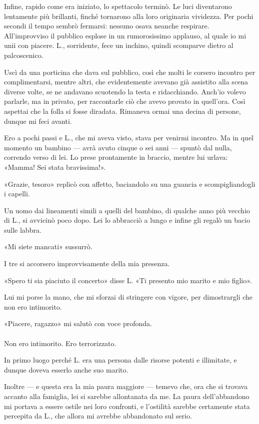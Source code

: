 \documentclass[a4paper,12pt]{book}
\begin{document}
Infine, rapido come era iniziato, lo spettacolo terminò. Le luci diventarono
lentamente più brillanti, finché tornarono alla loro originaria vividezza. Per
pochi secondi il tempo sembrò fermarsi: nessuno osava neanche respirare.
All'improvviso il pubblico esplose in un rumorosissimo applauso, al quale io mi
unii con piacere. L., sorridente, fece un inchino, quindi scomparve dietro al
palcoscenico.

Uscì da una porticina che dava sul pubblico, così che molti le corsero incontro
per complimentarsi, mentre altri, che evidentemente avevano già assistito alla
scena diverse volte, se ne andavano scuotendo la testa e ridacchiando. Anch'io
volevo parlarle, ma in privato, per raccontarle ciò che avevo provato in quell'ora.
Così aspettai che la folla si fosse diradata. Rimaneva ormai una decina di
persone, dunque mi feci avanti.

Ero a pochi passi e L., che mi aveva visto, stava per venirmi incontro. Ma in
quel momento un bambino --- avrà avuto cinque o sei anni --- spuntò dal nulla,
correndo verso di lei. Lo prese prontamente in braccio, mentre lui urlava:
«Mamma! Sei stata bravissima!».

«Grazie, tesoro» replicò con affetto, baciandolo su una guancia e scompigliandogli
i capelli.

Un uomo dai lineamenti simili a quelli del bambino, di qualche anno più vecchio
di L., si avvicinò poco dopo. Lei lo abbracciò a lungo e infine gli regalò un
bacio sulle labbra.

«Mi siete mancati» sussurrò.

I tre si accorsero improvvisamente della mia presenza.

«Spero ti sia piaciuto il concerto» disse L. «Ti presento mio marito e mio
figlio».

Lui mi porse la mano, che mi sforzai di stringere con vigore, per dimostrargli
che non ero intimorito.

«Piacere, ragazzo» mi salutò con voce profonda.

\paragraph{}
Non ero intimorito. Ero terrorizzato.

In primo luogo perché L. era una persona dalle risorse potenti e illimitate, e
dunque doveva esserlo anche suo marito.

Inoltre --- e questa era la mia paura maggiore --- temevo che, ora che si trovava
accanto alla famiglia, lei si sarebbe allontanata da me. La paura dell'abbandono
mi portava a essere ostile nei loro confronti, e l'ostilità sarebbe certamente
stata percepita da L., che allora mi avrebbe abbandonato sul serio.
\end{document}
